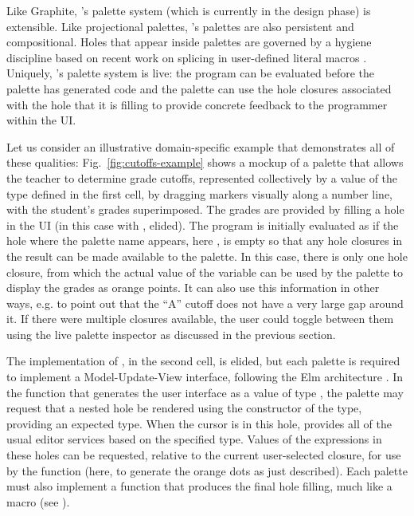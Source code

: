 Like Graphite, \Hazel's palette system (which is currently in the design phase) is extensible. 
Like projectional palettes, \Hazel's palettes are also persistent and compositional. 
Holes that appear inside palettes
are governed by a hygiene discipline based on recent work on splicing in user-defined literal macros
\cite{tlms-icfp18}. 
Uniquely, \Hazel's palette system is live: the program 
can be evaluated before the palette has generated code
and the palette can use the hole closures associated with the hole that it is filling 
to provide concrete feedback to the programmer within the UI.

Let us consider an illustrative domain-specific example that demonstrates
all of these qualities: 
Fig.~\ref{fig:cutoffs-example} shows a mockup of a palette that allows the teacher to determine grade cutoffs, represented collectively by a value of the type  defined in the first cell, by dragging markers visually along a number line, with the student's grades superimposed. The grades are provided by filling a hole in the UI (in this case with , elided). 
The program is initially evaluated as if the hole where the palette name appears, here , is empty so that 
any hole closures in the result can be made available to the palette. In this case, there is only one hole closure, from which the
actual value of the variable  can be 
used by the palette to display the grades as orange points.
It can also use this information in other ways, e.g. to point
out that the ``A'' cutoff does not have a very large gap around
it. If there were multiple closures available, the user could
toggle between them using the live palette inspector as discussed in the previous section.

%
The implementation of , in the second cell, is elided, but each palette is required to implement a
Model-Update-View interface, following the Elm architecture \cite{ElmArchitecture}. 
In the  function that generates the user
interface as a value of type , the palette may request that a nested hole be
rendered using the  constructor of the  type, providing an expected type. When the cursor is in this hole, \Hazel provides all of the usual editor services based on the specified type. Values of the expressions in these holes 
can be requested, relative to the current user-selected closure, for use by the  function (here, to generate the orange dots as just described). 
Each palette must
also implement a  function that produces the final
hole filling, much like a macro (see \cite{tlms-icfp18}).
